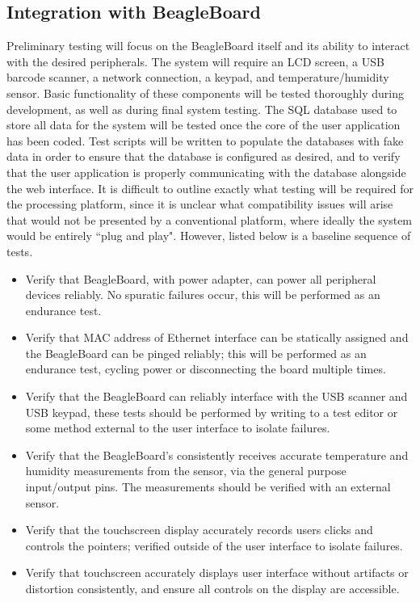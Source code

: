 \documentclass[11pt,letterpaper]{article}
\begin{document}
\subsection{Integration with BeagleBoard}
Preliminary testing will focus on the BeagleBoard itself and its ability to interact with the desired peripherals.  The system will require an LCD screen, a USB barcode scanner, a network connection, a keypad, and temperature/humidity sensor.  Basic functionality of these components will be tested thoroughly during development, as well as during final system testing. 
\newline \quad \newline
The SQL database used to store all data for the system will be tested once the core of the user application has been coded.  Test scripts will be written to populate the databases with fake data in order to ensure that the database is configured as desired, and to verify that the user application is properly communicating with the database alongside the web interface.
\newline \quad \newline
It is difficult to outline exactly what testing will be required for the processing platform, since it is unclear what compatibility issues will arise that would not be presented by a conventional platform, where ideally the system would be entirely ``plug and play". However, listed below is a baseline sequence of tests.
\begin{itemize}
\item Verify that BeagleBoard, with power adapter, can power all peripheral devices reliably. No spuratic failures occur, this will be performed as an endurance test.
\item Verify that MAC address of Ethernet interface can be statically assigned and the BeagleBoard can be pinged reliably; this will be performed as an endurance test, cycling power or disconnecting the board multiple times.
\item Verify that the BeagleBoard can reliably interface with the USB scanner and USB keypad, these tests should be performed by writing to a test editor or some method external to the user interface to isolate failures.
\item Verify that the BeagleBoard's consistently receives accurate temperature and humidity measurements from the sensor, via the general purpose input/output pins. The measurements should be verified with an external sensor.
\item Verify that the touchscreen display accurately records users clicks and controls the pointers; verified outside of the user interface to isolate failures.
\item Verify that touchscreen accurately displays user interface without artifacts or distortion consistently, and ensure all controls on the display are accessible.
\end{itemize}
\end{document}
